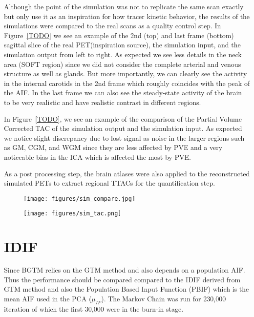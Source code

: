 Although the point of the simulation was not to replicate the same scan exactly but only use it as an inspiration for how tracer kinetic behavior, the results of the simulations were compared to the real scans as a quality control step.
In Figure~\ref{TODO} we see an example of the 2nd (top) and last frame (bottom) sagittal slice of the real PET(inspiration source), the simulation input, and the simulation output from left to right.
As expected we see less details in the neck area (SOFT region) since we did not consider the complete arterial and venous structure as well as glands.
But more importantly, we can clearly see the activity in the internal carotids in the 2nd frame which roughly coincides with the peak of the AIF.
In the last frame we can also see the steady-state activity of the brain to be very realistic and have realistic contrast in different regions.

In Figure~\ref{TODO}, we see an example of the comparison of the Partial Volume Corrected TAC of the simulation output and the simulation input.
As expected we notice slight discrepancy due to lost signal as noise in the larger regions such as GM, CGM, and WGM since they are less affected by PVE and a very noticeable bias in the ICA which is affected the most by PVE.

As a post processing step, the brain atlases were also applied to the reconstructed simulated PETs to extract regional TTACs for the quantification step.

\begin{figure}[h]
	\centering
	\texttt{[image: figures/sim\_compare.jpg]}
	\caption{}
\end{figure}

\begin{figure}[h]
	\centering
	\texttt{[image: figures/sim\_tac.png]}
	\caption{}
\end{figure}

\section{IDIF}

Since BGTM relies on the GTM method and also depends on a population AIF. Thus the performance should be compared compared to the IDIF derived from GTM method and also the Population Based Input Function (PBIF) which is the mean AIF used in the PCA (\(\mu_{IF}\)).
The Markov Chain was run for 230,000 iteration of which the first 30,000 were in the burn-in stage.


